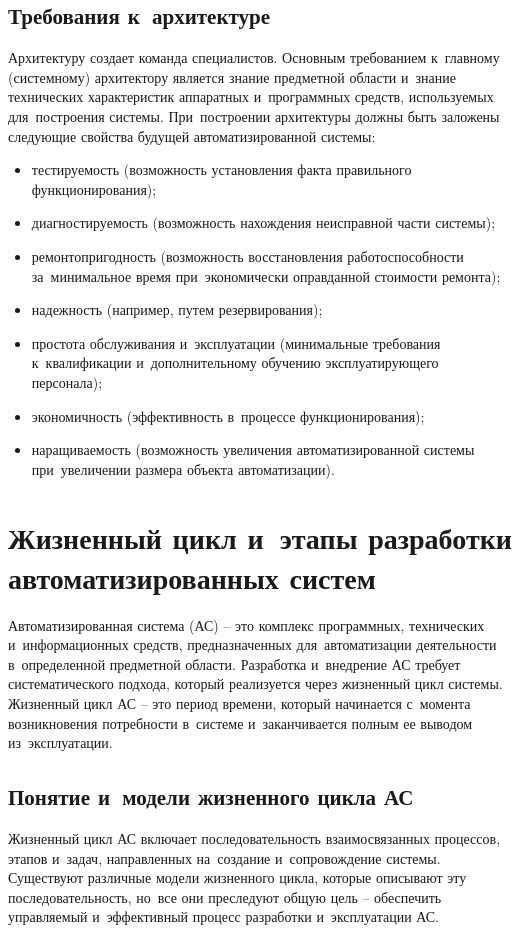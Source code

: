 \documentclass{ou}
\begin{document}
\subsection{Требования к~архитектуре}
Архитектуру создает команда специалистов. Основным требованием к~главному (системному) архитектору является знание предметной области и~знание технических характеристик аппаратных и~программных средств, используемых для~построения системы. При~построении архитектуры должны быть заложены следующие свойства будущей автоматизированной системы:
\begin{itemize}[label=-, leftmargin=0em, itemindent=3.35em, nosep]
\item тестируемость (возможность установления факта правильного функционирования);
\item диагностируемость (возможность нахождения неисправной части системы);
\item ремонтопригодность (возможность восстановления работоспособности за~минимальное время при~экономически оправданной стоимости ремонта);
\item надежность (например, путем резервирования);
\item простота обслуживания и~эксплуатации (минимальные требования к~квалификации и~дополнительному обучению эксплуатирующего персонала);
\item экономичность (эффективность в~процессе функционирования);
\item наращиваемость (возможность увеличения автоматизированной системы при~увеличении размера объекта автоматизации).
\end{itemize}
\newpage
\section{Жизненный цикл и~этапы разработки автоматизированных систем}
Автоматизированная система (АС) -- это комплекс программных, технических и~информационных средств, предназначенных для~автоматизации деятельности в~определенной предметной области. Разработка и~внедрение АС требует систематического подхода, который реализуется через жизненный цикл системы. Жизненный цикл АС – это период времени, который начинается с~момента возникновения потребности в~системе и~заканчивается полным ее выводом из~эксплуатации.
\subsection{Понятие и~модели жизненного цикла АС}
Жизненный цикл АС включает последовательность взаимосвязанных процессов, этапов и~задач, направленных на~создание и~сопровождение системы. Существуют различные модели жизненного цикла, которые описывают эту последовательность, но~все они преследуют общую цель -- обеспечить управляемый и~эффективный процесс разработки и~эксплуатации АС.
\end{document}
